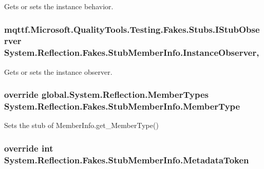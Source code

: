 Gets or sets the instance behavior.

\hypertarget{class_system_1_1_reflection_1_1_fakes_1_1_stub_member_info_a57457cc40a1f357c9baeae0d6247077e}{
\subsubsection[{Instance\-Observer}]{\setlength{\rightskip}{0pt plus 5cm}mqttf.\-Microsoft.\-Quality\-Tools.\-Testing.\-Fakes.\-Stubs.\-I\-Stub\-Observer System.\-Reflection.\-Fakes.\-Stub\-Member\-Info.\-Instance\-Observer\hspace{0.3cm}{\ttfamily [get]}, {\ttfamily [set]}}}\label{class_system_1_1_reflection_1_1_fakes_1_1_stub_member_info_a57457cc40a1f357c9baeae0d6247077e}


Gets or sets the instance observer.

\hypertarget{class_system_1_1_reflection_1_1_fakes_1_1_stub_member_info_a1c6f6723a1f0c5a33b81aa4272fe3a68}{
\subsubsection[{Member\-Type}]{\setlength{\rightskip}{0pt plus 5cm}override global.\-System.\-Reflection.\-Member\-Types System.\-Reflection.\-Fakes.\-Stub\-Member\-Info.\-Member\-Type\hspace{0.3cm}{\ttfamily [get]}}}\label{class_system_1_1_reflection_1_1_fakes_1_1_stub_member_info_a1c6f6723a1f0c5a33b81aa4272fe3a68}


Sets the stub of Member\-Info.\-get\-\_\-\-Member\-Type()

\hypertarget{class_system_1_1_reflection_1_1_fakes_1_1_stub_member_info_affbc08eed3f5250b1e98d3d738a71dee}{
\subsubsection[{Metadata\-Token}]{\setlength{\rightskip}{0pt plus 5cm}override int System.\-Reflection.\-Fakes.\-Stub\-Member\-Info.\-Metadata\-Token\hspace{0.3cm}{\ttfamily [get]}}}\label{class_system_1_1_reflection_1_1_fakes_1_1_stub_member_info_affbc08eed3f5250b1e98d3d738a71dee}


